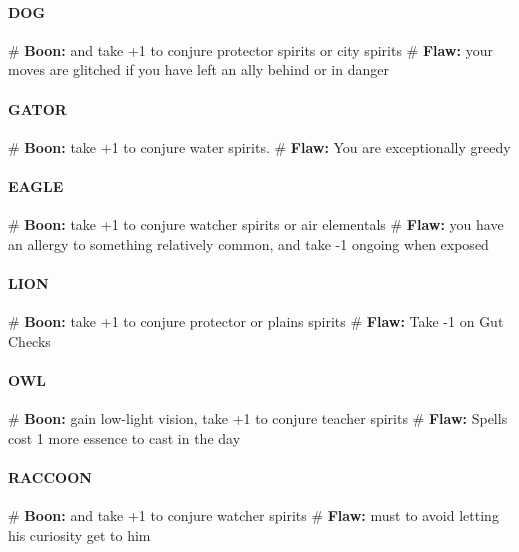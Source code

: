 \paragraph{DOG}
    \begin{easylist}
        # \textbf{Boon:} and take +1 to conjure protector spirits or city spirits
        # \textbf{Flaw:} your moves are glitched if you have left an ally behind or in danger
    \end{easylist}

\paragraph{GATOR}
    \begin{easylist}
        # \textbf{Boon:} take +1 to conjure water spirits.
        # \textbf{Flaw:} You are exceptionally greedy
    \end{easylist}

\paragraph{EAGLE}
    \begin{easylist}
        # \textbf{Boon:} take +1 to conjure watcher spirits or air elementals
        # \textbf{Flaw:} you have an allergy to something relatively common, and take -1 ongoing when exposed
    \end{easylist}

\paragraph{LION}
    \begin{easylist}
        # \textbf{Boon:} take +1 to conjure protector or plains spirits
        # \textbf{Flaw:} Take -1 on Gut Checks
    \end{easylist}

\paragraph{OWL}
    \begin{easylist}
        # \textbf{Boon:} gain low-light vision, take +1 to conjure teacher spirits
        # \textbf{Flaw:} Spells cost 1 more essence to cast in the day
    \end{easylist}

\paragraph{RACCOON}
    \begin{easylist}
        # \textbf{Boon:} and take +1 to conjure watcher spirits
        # \textbf{Flaw:} must  to avoid letting his curiosity get to him
    \end{easylist}

